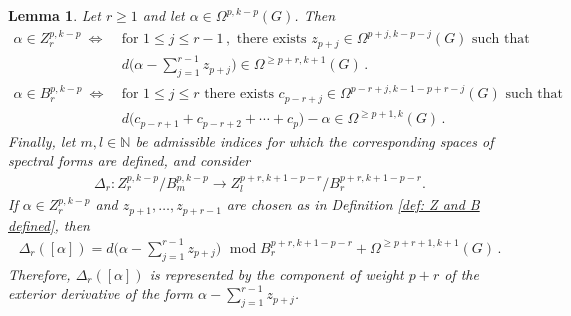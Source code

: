 \documentclass[dvipsnames]{amsart}
\newtheorem{lemma}[theorem]{Lemma}
\theoremstyle{definition}
\theoremstyle{definition}
\numberwithin{equation}{section}
\begin{document}
\begin{lemma}\label{remark: characterising Z and B with d}
    Let $r\geq 1$ and let $\alpha\in\Omega^{p,k-p}(G)$. Then
    \begin{align*}
    \alpha\in Z_r^{p,k-p}\ \Longleftrightarrow&\ \text{for }1\le j\le r-1\,,\text{ there exists }z_{p+j}\in\Omega^{p+j,k-p-j}(G)\text{ such that}\\&\ d\big( \alpha-\sum_{j=1}^{r-1}z_{p+j} \big) \in \Omega^{\geq p+r,k+1}(G)\,.\\
    \alpha\in B_r^{p,k-p}\ \Longleftrightarrow&\ \text{for }1\le j\le r\text{ there exists }c_{p-r+j}\in\Omega^{p- r+j,k-1-p+r-j}(G) \text{ such that }\\&\ d\big( c_{p-r+1} +c_{p-r+2} +\cdots +c_p \big) - \alpha \in \Omega^{\geq p+1,k}(G)\,.
\end{align*}   
    Finally, let $m,l\in\mathbb N$ be admissible indices for which the corresponding spaces of spectral forms are defined, and consider \begin{align*} 
    \Delta_r\colon Z_r^{p,k-p}/B_m^{p,k-p} \longrightarrow Z_l^{p+r,k+1-p-r}/B_r^{p+r,k+1-p-r}. 
    \end{align*}
    If $\alpha\in Z_r^{p,k-p}$ and $z_{p+1},\ldots,z_{p+r-1}$ are chosen as in Definition \ref{def: Z and B defined}, then
    \begin{align}\label{eq:scrittura delta in termini di d}
        \Delta_r ([\alpha]) = d\big( \alpha - \sum_{j=1}^{r-1} z_{p+j}\big) \,\,\operatorname{mod} B_r^{p+r,k+1-p-r} + \Omega^{\geq p+r+1, k+1}(G)\,.
    \end{align}
Therefore, $\Delta_r ([\alpha])$ is represented by the component of weight $p+r$ of the exterior derivative of the form $\alpha-\sum_{j=1}^{r-1}z_{p+j}$.

\end{lemma}
\end{document}
